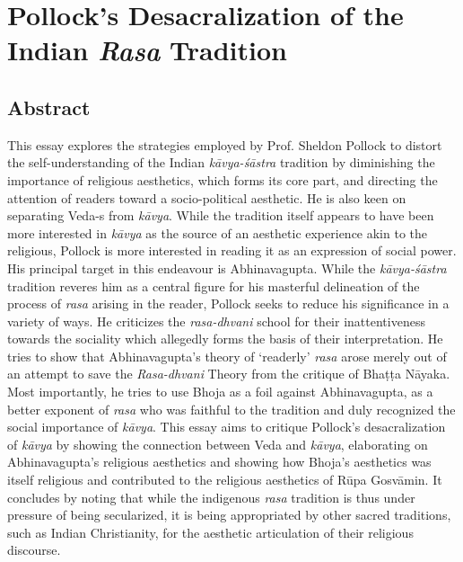 \chapter[Pollock’s Desacralization of the Indian \textsl{Rasa} Tradition]{Pollock’s Desacralization of the Indian \textsl{Rasa} Tradition}\label{chapter\thechapter:begin}

\section*{Abstract}

This essay explores the strategies employed by Prof. Sheldon Pollock to distort the self-understanding of the Indian \textsl{kāvya-śāstra} tradition by diminishing the importance of religious aesthetics, which forms its core part, and directing the attention of readers toward a socio-political aesthetic. He is also keen on separating Veda-s from \textsl{kāvya}. While the tradition itself appears to have been more interested in \textsl{kāvya} as the source of an aesthetic experience akin to the religious, Pollock is more interested in reading it as an expression of social power. His principal target in this endeavour is Abhinavagupta. While the \textsl{kāvya-śāstra} tradition reveres him as a central figure for his masterful delineation of the process of \textsl{rasa} arising in the reader, Pollock seeks to reduce his significance in a variety of ways. He criticizes the \textsl{rasa-dhvani} school for their inattentiveness towards the sociality which allegedly forms the basis of their interpretation. He tries to show that Abhinavagupta's theory of `readerly' \textsl{rasa} arose merely out of an attempt to save the \textsl{Rasa-dhvani} Theory from the critique of Bhaṭṭa Nāyaka. Most importantly, he tries to use Bhoja as a foil against Abhinavagupta, as a better exponent of \textsl{rasa} who was faithful to the tradition and duly recognized the social importance of \textsl{kāvya}. This essay aims to critique Pollock's desacralization of \textsl{kāvya} by showing the connection between Veda and \textsl{kāvya}, elaborating on Abhinavagupta's religious aesthetics and showing how Bhoja's aesthetics was itself religious and contributed to the religious aesthetics of Rūpa Gosvāmin. It concludes by noting that while the indigenous \textsl{rasa} tradition is thus under pressure of being secularized, it is being appropriated by other sacred traditions, such as Indian Christianity, for the aesthetic articulation of their religious discourse.

